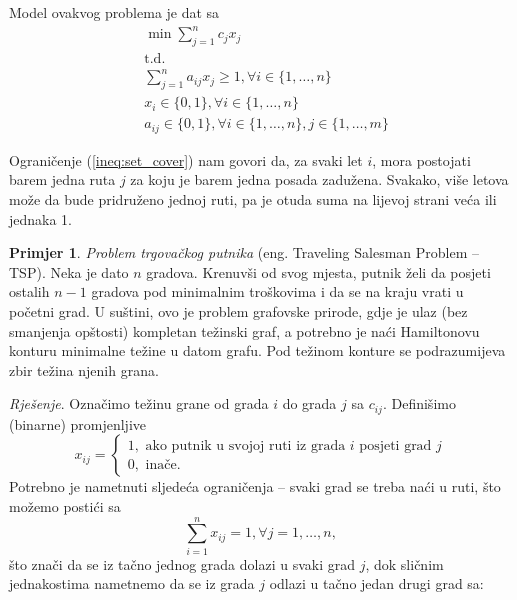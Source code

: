 \documentclass[b5paper, utf8, 11pt, colorlinks]{book}
\theoremstyle{definition}
\newtheorem{primjer}{Primjer}[chapter]
\begin{document}
Model ovakvog problema je dat sa 
\begin{align}
	&\min \sum_{j=1}^n c_j x_j \nonumber\\
	&\mbox{t.d.} \nonumber \\
	& \sum_{j=1}^n a_{ij} x_j \geq 1, \forall i \in \{1,\ldots, n\} \label{ineq:set_cover} \\
	& x_i \in \{0, 1 \}, \forall i \in \{1, \ldots, n\} \\
	& a_{ij} \in \{0, 1\}, \forall i \in \{1, \ldots, n\}, j \in\{1,\ldots, m\} \nonumber
\end{align}

Ograničenje (\ref{ineq:set_cover}) nam govori da, za svaki let $i$, mora postojati barem jedna ruta $j$ za koju je barem jedna posada zadužena. Svakako,  više letova može da bude pridruženo jednoj ruti, pa je otuda suma na lijevoj strani veća ili jednaka 1. 
\begin{primjer}
	\emph{Problem trgovačkog putnika} (eng.  {Traveling Salesman Problem -- TSP)}. Neka je dato $n$ gradova. Krenuvši od svog mjesta, putnik želi da posjeti ostalih $n-1$ gradova pod minimalnim troškovima i da se na kraju vrati u početni grad. U suštini, ovo je problem grafovske prirode, gdje je ulaz (bez smanjenja opštosti) kompletan težinski graf, a potrebno je naći Hamiltonovu konturu minimalne težine u datom grafu. Pod težinom konture se podrazumijeva zbir težina njenih grana. 
\end{primjer}
\emph{Rješenje}. Označimo težinu grane od grada $i$ do grada $j$ sa $c_{ij}$.  Definišimo (binarne) promjenljive 
$$x_{ij} = \begin{cases}
	1, \mbox{ ako putnik u svojoj ruti iz grada } i \mbox{ posjeti grad } j \\
	0, \mbox{ inače}. 
\end{cases}$$ 
Potrebno je nametnuti sljedeća ograničenja -- svaki grad se treba naći u ruti,  što možemo postići sa 
$$  \sum_{i=1}^n x_{ij} = 1, \forall j =1,\ldots, n,$$ 
što znači da se iz tačno jednog grada dolazi u svaki grad $j$, dok sličnim jednakostima nametnemo da se iz grada $j$ odlazi u tačno jedan drugi grad sa:
\end{document}
